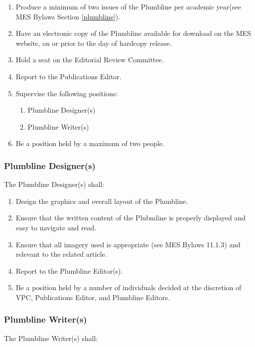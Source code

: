 \begin{enumerate}
 \item
  Produce a minimum of two issues of the Plumbline per academic year(see MES Bylaws Section \ref{plumbline}).
 \item
  Have an electronic copy of the Plumbline available for download on the MES website, on or prior to the day of hardcopy release.
 \item
  Hold a seat on the Editorial Review Committee. 
 \item     
  Report to the Publications Editor.
 \item    
  Supervise the following positions: 
  \begin{enumerate} 
    \item    
     Plumbline Designer(s) 
    \item     
     Plumbline Writer(s)  
  \end{enumerate} 
 \item  
  Be a position held by a maximum of two people.

\end{enumerate}

\subsubsection{Plumbline Designer(s)}
\label{plumbline-designers} 
The Plumbline Designer(s) shall: 

\begin{enumerate} 
  \item 
   Design the graphics and overall layout of the Plumbline. 
  \item    
   Ensure that the written content of the Plubmline is properly displayed and easy to navigate and read. 
  \item     
   Ensure that all imagery used is appropriate (see MES Bylaws 11.1.3) and relevant to the related article. 
  \item     
   Report to the Plumbline Editor(s). 
  \item     
   Be a position held by a number of individuals decided at the discretion of VPC, Publications Editor, and Plumbline Editors. 

\end{enumerate} 

\subsubsection{Plumbline Writer(s)}
\label{plumbline-writers}
The Plumbline Writer(s) shall: 

